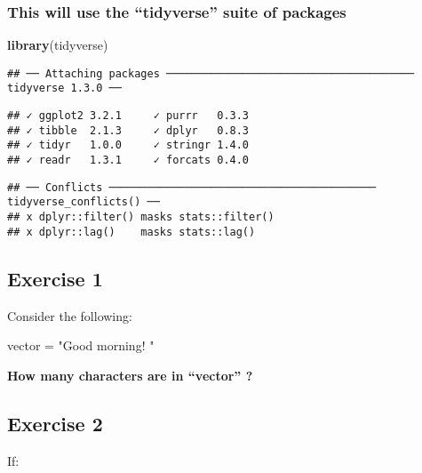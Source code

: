 \documentclass[]{article}
\author{}
\date{\vspace{-2.5em}}
\newenvironment{Shaded}{\begin{snugshade}}{\end{snugshade}}
\newcommand{\KeywordTok}[1]{\textcolor[rgb]{0.13,0.29,0.53}{\textbf{#1}}}
\newcommand{\NormalTok}[1]{#1}
\newcommand{\StringTok}[1]{\textcolor[rgb]{0.31,0.60,0.02}{#1}}
\begin{document}
\hypertarget{this-will-use-the-tidyverse-suite-of-packages}{%
\subsubsection{This will use the ``tidyverse'' suite of
packages}\label{this-will-use-the-tidyverse-suite-of-packages}}

\begin{Shaded}
\begin{Highlighting}[]
\KeywordTok{library}\NormalTok{(tidyverse)}
\end{Highlighting}
\end{Shaded}

\begin{verbatim}
## ── Attaching packages ─────────────────────────────────────── tidyverse 1.3.0 ──
\end{verbatim}

\begin{verbatim}
## ✓ ggplot2 3.2.1     ✓ purrr   0.3.3
## ✓ tibble  2.1.3     ✓ dplyr   0.8.3
## ✓ tidyr   1.0.0     ✓ stringr 1.4.0
## ✓ readr   1.3.1     ✓ forcats 0.4.0
\end{verbatim}

\begin{verbatim}
## ── Conflicts ────────────────────────────────────────── tidyverse_conflicts() ──
## x dplyr::filter() masks stats::filter()
## x dplyr::lag()    masks stats::lag()
\end{verbatim}

\hypertarget{exercise-1}{%
\subsection{Exercise 1}\label{exercise-1}}

Consider the following:

\begin{Shaded}
\begin{Highlighting}[]
\NormalTok{vector =}\StringTok{ "Good morning! "}
\end{Highlighting}
\end{Shaded}

\textbf{How many characters are in ``vector'' ?}

\hypertarget{exercise-2}{%
\subsection{Exercise 2}\label{exercise-2}}

If:
\end{document}

